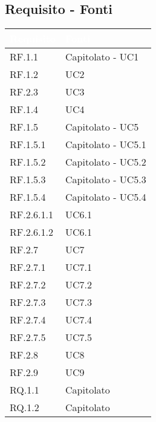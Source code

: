 \subsection{Requisito - Fonti}
\begin{center}
  \centering
  \begin{longtable}{|C{6cm}|C{6cm}|}
    \hline
    \textcolor[HTML]{FFFFFF}{\textbf{Requisito}} & \textcolor[HTML]{FFFFFF}{\textbf{Fonti}} \\ \hline
    RF.1.1 & Capitolato - UC1 \\ \hline
    RF.1.2 & UC2 \\ \hline
    RF.2.3 & UC3 \\ \hline
    RF.1.4 & UC4 \\ \hline
    RF.1.5 & Capitolato - UC5 \\ \hline
    RF.1.5.1 & Capitolato - UC5.1 \\ \hline
    RF.1.5.2 & Capitolato - UC5.2 \\ \hline
    RF.1.5.3 & Capitolato - UC5.3 \\ \hline
    RF.1.5.4 & Capitolato - UC5.4 \\ \hline
    RF.2.6.1.1 & UC6.1 \\ \hline
    RF.2.6.1.2 & UC6.1 \\ \hline
    RF.2.7 & UC7 \\ \hline
    RF.2.7.1 & UC7.1 \\ \hline
    RF.2.7.2 & UC7.2 \\ \hline
    RF.2.7.3 & UC7.3 \\ \hline
    RF.2.7.4 & UC7.4 \\ \hline
    RF.2.7.5 & UC7.5 \\ \hline
    RF.2.8 & UC8 \\ \hline
    RF.2.9 & UC9 \\ \hline
    RQ.1.1 & Capitolato \\ \hline
    RQ.1.2 & Capitolato \\ \hline

\end{longtable}
\end{center}
